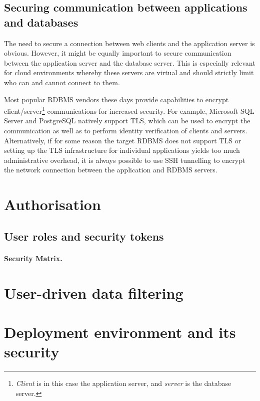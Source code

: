 \documentclass[a4paper,12pt,oneside,openright]{memoir}
\begin{document}
\subsection*{Securing communication between applications and databases}
	The need to secure a connection between web clients and the application server is obvious.
	However, it might be equally important to secure communication between the application server and the database server.
	This is especially relevant for cloud environments whereby these servers are virtual and should strictly limit who can and cannot connect to them.

	Most popular RDBMS vendors these days provide capabilities to encrypt client/server\footnote{\emph{Client} is in this case the application server, and \emph{server} is the database server.} communications for increased security.
	For example, Microsoft SQL Server and PostgreSQL natively support TLS, which can be used to encrypt the communication as well as to perform identity verification of clients and servers.
	Alternatively, if for some reason the target RDBMS does not support TLS or setting up the TLS infrastructure for individual applications yields too much administrative overhead, it is always possible to use SSH tunnelling to encrypt the network connection between the application and RDBMS servers.

\section*{Authorisation}\label{sec:03}

\subsection*{User roles and security tokens}

\paragraph{Security Matrix.}

\section*{User-driven data filtering}

\section*{Deployment environment and its security}\label{sec:04}
\end{document}

